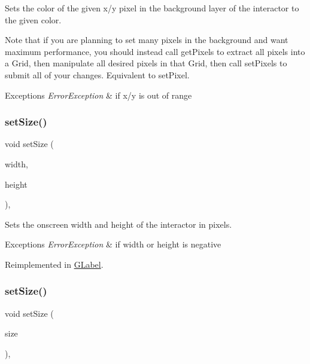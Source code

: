 Sets the color of the given x/y pixel in the background layer of the interactor to the given color. 

Note that if you are planning to set many pixels in the background and want maximum performance, you should instead call get\+Pixels to extract all pixels into a Grid, then manipulate all desired pixels in that Grid, then call set\+Pixels to submit all of your changes. Equivalent to set\+Pixel.


\begin{DoxyExceptions}{Exceptions}
{\em Error\+Exception} & if x/y is out of range \\
\hline
\end{DoxyExceptions}
\mbox{\label{classGInteractor_aca25d49481f9bf5fc8f7df4c086c4ce7}} 
\subsubsection{\texorpdfstring{set\+Size()}{setSize()}\hspace{0.1cm}{\footnotesize\ttfamily [1/2]}}
{\footnotesize\ttfamily void set\+Size (\begin{DoxyParamCaption}\item[{double}]{width,  }\item[{double}]{height }\end{DoxyParamCaption})\hspace{0.3cm}{\ttfamily [virtual]}, {\ttfamily [inherited]}}



Sets the onscreen width and height of the interactor in pixels. 


\begin{DoxyExceptions}{Exceptions}
{\em Error\+Exception} & if width or height is negative \\
\hline
\end{DoxyExceptions}


Reimplemented in \mbox{\hyperlink{classGLabel_a8ba9af72c23f52d4b93096a13a11f150}{G\+Label}}.

\mbox{\label{classGInteractor_ae2b628228f192c2702c4ce941b2af68f}} 
\subsubsection{\texorpdfstring{set\+Size()}{setSize()}\hspace{0.1cm}{\footnotesize\ttfamily [2/2]}}
{\footnotesize\ttfamily void set\+Size (\begin{DoxyParamCaption}\item[{const \mbox{\hyperlink{structGDimension}{G\+Dimension}} \&}]{size }\end{DoxyParamCaption})\hspace{0.3cm}{\ttfamily [virtual]}, {\ttfamily [inherited]}}



